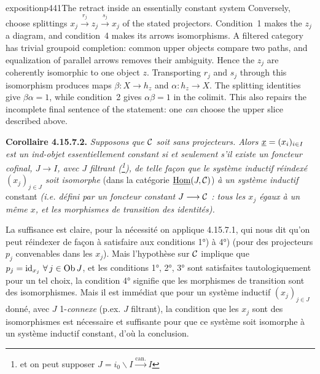 \begin{dcomment}{exposition}{p441}{The retract inside an essentially constant system}
Conversely, choose splittings $x_j\xrightarrow{r_j}z_j\xrightarrow{s_j}x_j$ of the stated projectors. Condition~1 makes the $z_j$ a diagram, and condition~4 makes its arrows isomorphisms. A filtered category has trivial groupoid completion: common upper objects compare two paths, and equalization of parallel arrows removes their ambiguity. Hence the $z_j$ are coherently isomorphic to one object $z$. Transporting $r_j$ and $s_j$ through this isomorphism produces maps $\beta:X\to h_z$ and $\alpha:h_z\to X$. The splitting identities give $\beta\alpha=1$, while condition~2 gives $\alpha\beta=1$ in the colimit. This also repairs the incomplete final sentence of the statement: one \emph{can} choose the upper slice described above.
\end{dcomment}


\textbf{Corollaire 4.15.7.2.} \textit{Supposons que $\mathcal{C}$ soit sans projecteurs. Alors $\underline{x} = (x_i)_{i\in I}$ est un ind-objet essentiellement constant si et seulement s'il existe un foncteur cofinal, $J \longrightarrow I$, avec $J$ filtrant (\footnote{et on peut supposer $J = i_0\backslash I \xrightarrow{\text{can.}} I$}), de telle façon que le système inductif réindexé $(x_j)_{j\in J}$ soit isomorphe} (dans la catégorie $\underline{\mathrm{Hom}}(J,\mathcal{C})$) \textit{à un système inductif} constant \textit{(i.e. défini par un foncteur constant $J \longrightarrow \mathcal{C}$ : tous les $x_j$ égaux à un même $x$, et les morphismes de transition des identités).}

La suffisance est claire, pour la nécessité on applique 4.15.7.1, qui nous dit qu'on peut réindexer de façon à satisfaire aux conditions 1°) à 4°) (pour des projecteurs $p_j$ convenables dans les $x_j$). Mais l'hypothèse sur $\mathcal{C}$ implique que $p_j = \mathrm{id}_{x_j}\ \forall\, j \in \operatorname{Ob} J$, et les conditions 1°, 2°, 3° sont satisfaites tautologiquement pour un tel choix, la condition 4° signifie que les morphismes de transition sont des isomorphismes. Mais il est immédiat que pour un système inductif $(x_j)_{j\in J}$ donné, avec $J$ 1-\textit{connexe} (p.ex. $J$ filtrant), la condition que les $x_j$ sont des isomorphismes %
est nécessaire et suffisante pour que ce système soit isomorphe à un système inductif constant, d'où la conclusion.

